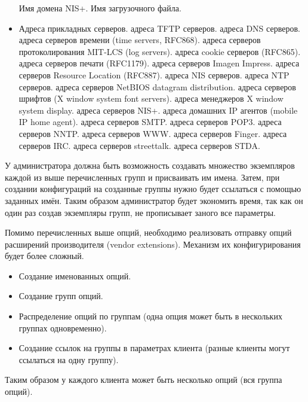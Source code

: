 \documentclass[14pt]{extarticle}
\begin{document}
\begin{itemize}
        \subitem Имя домена NIS+.
        \subitem Имя загрузочного файла.
    \item Адреса прикладных серверов.
        \subitem адреса TFTP серверов.
        \subitem адреса DNS серверов.
        \subitem адреса серверов времени (time servers, RFC868).
        \subitem адреса серверов протоколирования MIT-LCS (log servers).
        \subitem адреса cookie серверов (RFC865).
        \subitem адреса серверов печати (RFC1179).
        \subitem адреса серверов Imagen Impress.
        \subitem адреса серверов Resource Location (RFC887).
        \subitem адреса NIS серверов.
        \subitem адреса NTP серверов.
        \subitem адреса серверов NetBIOS datagram distribution.
        \subitem адреса серверов шрифтов (X window system font servers).
        \subitem адреса менеджеров X window system display.
        \subitem адреса серверов NIS+.
        \subitem адреса домашних IP агентов (mobile IP home agent).
        \subitem адреса серверов SMTP.
        \subitem адреса серверов POP3.
        \subitem адреса серверов NNTP.
        \subitem адреса серверов WWW.
        \subitem адреса серверов Finger.
        \subitem адреса серверов IRC.
        \subitem адреса серверов streettalk.
        \subitem адреса серверов STDA.
\end{itemize}

У администратора должна быть возможность создавать множество экземпляров каждой из выше перечисленных групп и присваивать им имена.
Затем, при создании конфигураций на созданные группы нужно будет ссылаться с помощью заданных имён.
Таким образом администратор будет экономить время, так как он один раз создав экземпляры групп, не прописывает заного все параметры.

Помимо перечисленных выше опций, необходимо реализовать отправку опций расширений производителя (vendor extensions).
Механизм их конфигурирования будет более сложный.
\begin {itemize}
    \item Создание именованных опций.
    \item Создание групп опций.
    \item Распределение опций по группам (одна опция может быть в нескольких группах одновременно).
    \item Создание ссылок на группы в параметрах клиента (разные клиенты могут ссылаться на одну группу).
\end{itemize}

Таким образом у каждого клиента может быть несколько опций (вся группа опций).
\end{document}
